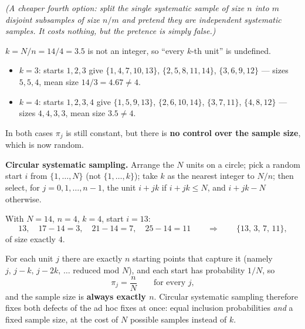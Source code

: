 \emph{(A cheaper fourth option: split the single systematic sample of size $n$ into $m$ disjoint
subsamples of size $n/m$ and pretend they are independent systematic samples. It costs nothing,
but the pretence is simply false.)}

 $k=N/n=14/4=3.5$ is not an integer, so ``every $k$-th unit'' is undefined.
\begin{itemize}
  \item \textbf{$k=3$}: starts $1,2,3$ give $\{1,4,7,10,13\}$, $\{2,5,8,11,14\}$,
        $\{3,6,9,12\}$ --- sizes $5,5,4$, mean size $14/3=4.67\ne4$.
  \item \textbf{$k=4$}: starts $1,2,3,4$ give $\{1,5,9,13\}$, $\{2,6,10,14\}$, $\{3,7,11\}$,
        $\{4,8,12\}$ --- sizes $4,4,3,3$, mean size $3.5\ne4$.
\end{itemize}
In both cases $\pi_j$ is still constant, but there is \textbf{no control over the sample size},
which is now random.

 \textbf{Circular systematic sampling.} Arrange the $N$ units on a circle; pick a random
start $i$ from $\{1,\dots,N\}$ (not $\{1,\dots,k\}$); take $k$ as the nearest integer to $N/n$;
then select, for $j=0,1,\dots,n-1$, the unit $i+jk$ if $i+jk\le N$, and $i+jk-N$ otherwise.

With $N=14$, $n=4$, $k=4$, start $i=13$:
\[
  13,\quad 17-14=3,\quad 21-14=7,\quad 25-14=11
  \qquad\Longrightarrow\qquad \{13,\,3,\,7,\,11\},
\]
of size exactly $4$.

 For each unit $j$ there are exactly $n$ starting points that capture it (namely
$j,\,j-k,\,j-2k,\,\dots$ reduced mod $N$), and each start has probability $1/N$, so
\[
  \pi_j=\frac nN\qquad\text{for every }j,
\]
and the sample size is \textbf{always exactly $n$}. Circular systematic sampling therefore fixes
both defects of the ad hoc fixes at once: equal inclusion probabilities \emph{and} a fixed sample
size, at the cost of $N$ possible samples instead of $k$.

